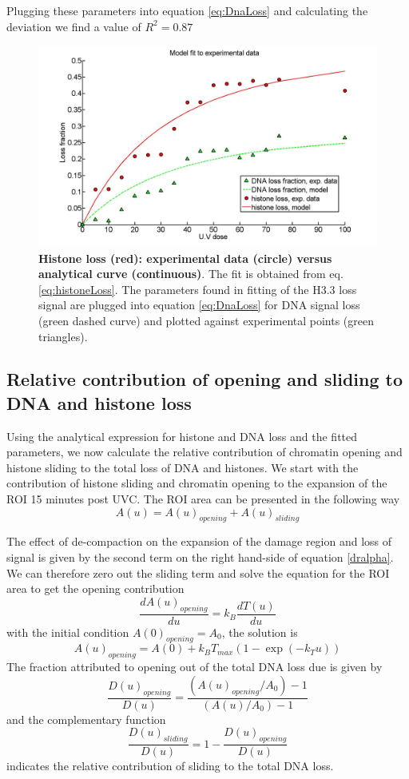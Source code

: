 \documentclass[12pt]{article}
\begin{document}
Plugging these parameters into equation \ref{eq:DnaLoss} and calculating the deviation we find a value of $R^2=0.87$
\begin{figure}[H]
\centering
\includegraphics[width=0.6\linewidth, height=0.3\textheight]{histoneAndDnaVsUvDoseModelFit}
\caption{\textbf{Histone loss (red): experimental data (circle) versus analytical curve (continuous)}. The fit is obtained from  eq. \ref{eq:histoneLoss}.  The parameters found in fitting of the H3.3 loss signal are plugged into equation \ref{eq:DnaLoss} for DNA signal loss (green dashed curve) and plotted against experimental points (green triangles).}
\label{fig:histoneAndDnaVsUvDoseModelFit}
\end{figure}


\subsection{Relative contribution of opening and sliding to DNA and histone loss}
Using the analytical expression for histone and DNA loss and the fitted parameters, we now   calculate the relative contribution of chromatin opening and histone sliding to the total loss of DNA and histones.
We start with the contribution of histone sliding and chromatin opening to the expansion of the ROI 15 minutes post UVC. The ROI area can be presented in the following way
\begin{equation*}
A(u) = A(u)_{opening}+A(u)_{sliding}
\end{equation*}

The effect of de-compaction on the expansion of the damage region and loss of signal is given by the second term on the right hand-side of equation \ref{dralpha}. We can therefore zero out the sliding term and solve the equation for the ROI area to get the opening contribution 
\begin{equation*}
\frac{dA(u)_{opening}}{du}=k_B\frac{dT(u)}{du}
\end{equation*}
with the initial condition $A(0)_{opening}=A_0$, the solution is 
\begin{equation}
A(u)_{opening}= A(0)+k_BT_{max}(1-\exp(-k_Tu))
\end{equation}
The fraction attributed to opening out of the total DNA loss due is given by 
\begin{equation}
\frac{D(u)_{opening}}{D(u)}=\frac{\left(A(u)_{opening}/A_0\right)-1}{\left(A(u)/A_0\right) -1}
\end{equation}
and the complementary function 
\begin{equation}
\frac{D(u)_{sliding}}{D(u)}=1-\frac{D(u)_{opening}}{D(u)}
\end{equation}
indicates the relative contribution of sliding to the total DNA loss. 
\end{document}
